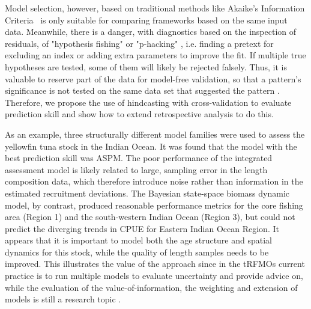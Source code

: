 \documentclass[12pt,halfline,a4paper,nonumbib]{ouparticle}
\begin{document}
Model selection, however, based on traditional methods like Akaike’s Information Criteria  \parencite[AIC,][]{akaike1998information} is only suitable for comparing frameworks based on the same input data. Meanwhile, there is a danger, with diagnostics based on the inspection of residuals, of "hypothesis fishing" or "p-hacking" \parencite{wasserstein2016asa,head2015extent}, i.e. finding a pretext for excluding an index or adding extra parameters \parencite[e.g.][]{schirripa2017hypothesis} to improve the fit. If multiple true hypotheses are tested, some of them will likely be rejected falsely. Thus, it is valuable to reserve part of the data for model-free validation, so that a pattern’s significance is not tested on the same data set that suggested the pattern \citep{arlot2010survey}. Therefore, we propose the use of hindcasting with cross-validation to evaluate prediction skill and show how to extend retrospective analysis to do this.

As an example, three structurally different model families were used to assess the yellowfin tuna stock in the Indian Ocean. It was found that the model with the best prediction skill was ASPM. The poor performance of the integrated assessment model is likely related to large, sampling error in the length composition data, which therefore introduce noise rather than information in the estimated recruitment deviations. The Bayesian state-space biomass dynamic model, by contrast, produced reasonable performance metrics for the core fishing area (Region 1) and the south-western Indian Ocean (Region 3), but could not predict the diverging trends in CPUE for Eastern Indian Ocean Region. It appears that it is important to model both the age structure and spatial dynamics for this stock, while the quality of length samples needs to be improved. This illustrates the value of the approach since in the tRFMOs current practice is to run multiple models to evaluate uncertainty and provide advice on, while the evaluation of the value-of-information, the weighting and extension of models is still a research topic \cite{kell2016quantification}. 
\end{document}

